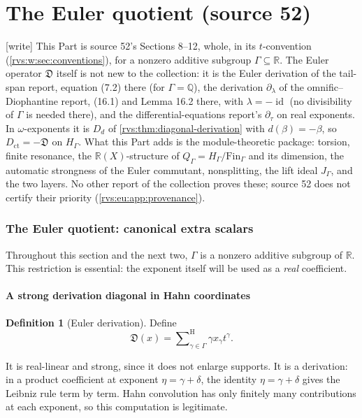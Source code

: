 \documentclass[11pt,letterpaper]{article}
\numberwithin{equation}{section}
\theoremstyle{definition}
\newtheorem{definition}[theorem]{Definition}
\theoremstyle{remark}
\newcommand{\R}{\mathbb{R}}
\newcommand{\Q}{\mathbb{Q}}
\newcommand{\id}{\operatorname{id}}
\newcommand{\ct}{\operatorname{ct}}
\newcommand{\hSum}{\mathop{\sum}\nolimits^{\mathrm H}}
\newcommand{\EuD}{\mathfrak D}%
\newcommand{\FinS}[1]{\mathrm{Fin}_{#1}}%
\newcommand{\wtag}{\textup{[write]}}%
\begin{document}
\part{The Euler quotient (source 52)}\label{rvs:w:part:euler}

\noindent\wtag{} This Part is source 52's Sections 8--12, whole, in its
\(t\)-convention (\cref{rvs:w:sec:conventions}), for a nonzero additive
subgroup \(\Gamma\subseteq\R\).  The Euler operator \(\EuD\) itself is not new
to the collection: it is the Euler derivation of the tail-span report,
equation (7.2) there (for \(\Gamma=\Q\)), the derivation \(\partial_\lambda\) of
the omnific--Diophantine report, (16.1) and Lemma 16.2 there, with
\(\lambda=-\id\) (no divisibility of \(\Gamma\) is needed there), and the
differential-equations report's \(\partial_\tau\) on real exponents.  In
\(\omega\)-exponents it is \(D_d\) of \cref{rvs:thm:diagonal-derivation} with
\(d(\beta)=-\beta\), so \(D_{\ct}=-\EuD\) on \(H_\Gamma\).  What this Part adds
is the module-theoretic package: torsion, finite resonance, the
\(\R(X)\)-structure of \(Q_\Gamma=H_\Gamma/\FinS\Gamma\) and its dimension, the
automatic strongness of the Euler commutant, nonsplitting, the lift ideal
\(J_\Gamma\), and the two layers.  No other report of the collection proves
these; source 52 does not certify their priority (\cref{rvs:eu:app:provenance}).

\section{The Euler quotient: canonical extra scalars}\label{rvs:eu:sec:euler}
Throughout this section and the next two, $\Gamma$ is a nonzero additive subgroup of $\R$. This restriction is essential: the exponent itself will be used as a \emph{real} coefficient.

\subsection{A strong derivation diagonal in Hahn coordinates}
\begin{definition}[Euler derivation]
Define
\[
 \EuD(x)=\hSum_{\gamma\in\Gamma}\gamma x_\gamma t^\gamma.
\]
\end{definition}
It is real-linear and strong, since it does not enlarge supports. It is a derivation: in a product coefficient at exponent $\eta=\gamma+\delta$, the identity $\eta=\gamma+\delta$ gives the Leibniz rule term by term. Hahn convolution has only finitely many contributions at each exponent, so this computation is legitimate.
\end{document}
